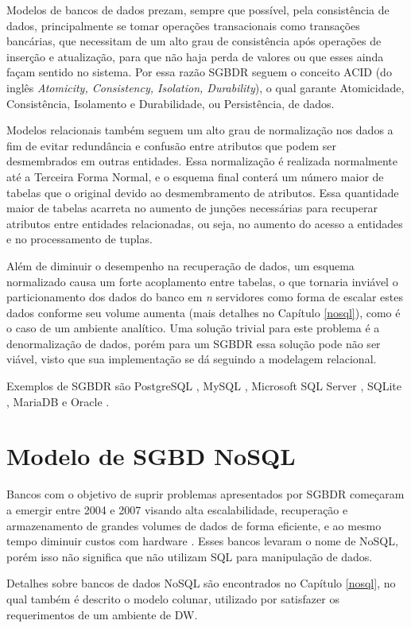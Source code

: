 Modelos de bancos de dados prezam, sempre que possível, pela consistência de dados, principalmente se tomar operações transacionais como transações bancárias, que necessitam de um alto grau de consistência após operações de inserção e atualização, para que não haja perda de valores ou que esses ainda façam sentido no sistema. Por essa razão SGBDR seguem o conceito ACID (do inglês \textit{Atomicity, Consistency, Isolation, Durability}), o qual garante Atomicidade, Consistência, Isolamento e Durabilidade, ou Persistência, de dados. 

Modelos relacionais também seguem um alto grau de normalização nos dados a fim de evitar redundância e confusão entre atributos que podem ser desmembrados em outras entidades. Essa normalização é realizada normalmente até a Terceira Forma Normal, e o esquema final conterá um número maior de tabelas que o original devido ao desmembramento de atributos. Essa quantidade maior de tabelas acarreta no aumento de junções necessárias para recuperar atributos entre entidades relacionadas, ou seja, no aumento do acesso a entidades e no processamento de tuplas.

Além de diminuir o desempenho na recuperação de dados, um esquema normalizado causa um forte acoplamento entre tabelas, o que tornaria inviável o particionamento dos dados do banco em \textit{n} servidores como forma de escalar estes dados conforme seu volume aumenta (mais detalhes no Capítulo \ref{nosql}), como é o caso de um ambiente analítico. Uma solução trivial para este problema é a denormalização de dados, porém para um SGBDR essa solução pode não ser viável, visto que sua implementação se dá seguindo a modelagem relacional.

Exemplos de SGBDR são PostgreSQL \cite{postgres2018r}, MySQL \cite{mysql2018r}, Microsoft SQL Server \cite{microsoft2018r}, SQLite \cite{lite2018r}, MariaDB \cite{maria2018r} e Oracle \cite{oracle2018r}. 

\section{Modelo de SGBD NoSQL}

Bancos com o objetivo de suprir problemas apresentados por SGBDR começaram a emergir entre 2004 e 2007 visando alta escalabilidade, recuperação e armazenamento de grandes volumes de dados de forma eficiente, e ao mesmo tempo diminuir custos com hardware \cite{han2011nosql}. Esses bancos levaram o nome de NoSQL, porém isso não significa que não utilizam SQL para manipulação de dados.

Detalhes sobre bancos de dados NoSQL são encontrados no Capítulo \ref{nosql}, no qual também é descrito o modelo colunar, utilizado por satisfazer os requerimentos de um ambiente de DW.